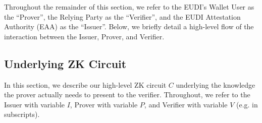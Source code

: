 Throughout the remainder of this section, we refer to the EUDI's Wallet User as the ``Prover'', the Relying Party as the ``Verifier'', and the EUDI Attestation Authority (EAA) as the ``Issuer''. Below, we briefly detail a high-level flow of the interaction between the Issuer, Prover, and Verifier.



\subsection{Underlying ZK Circuit}

In this section, we describe our high-level ZK circuit $C$ underlying the knowledge the prover actually needs to present to the verifier.
Throughout, we refer to the Issuer with variable $I$, Prover with variable $P$, and Verifier with variable $V$ (e.g. in subscripts). 

